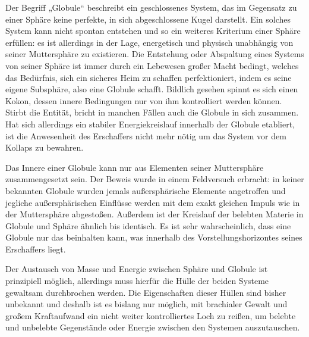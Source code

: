 \documentclass[a5paper,8pt]{book}
\begin{document}
Der Begriff „Globule“ beschreibt ein geschlossenes System, das im Gegensatz zu einer Sphäre keine perfekte, in sich 
abgeschlossene Kugel darstellt. Ein solches System kann nicht spontan entstehen und so ein weiteres Kriterium einer 
Sphäre erfüllen: es ist allerdings in der Lage, energetisch und physisch unabhängig von seiner Muttersphäre zu existieren. 
Die Entstehung oder Abspaltung eines Systems von seiner Sphäre ist immer durch ein Lebewesen großer Macht bedingt, welches 
das Bedürfnis, sich ein sicheres Heim zu schaffen perfektioniert, indem es seine eigene Subsphäre, also eine Globule 
schafft. Bildlich gesehen spinnt es sich einen Kokon, dessen innere Bedingungen nur von ihm kontrolliert werden können. 
Stirbt die Entität, bricht in manchen Fällen auch die Globule in sich zusammen. Hat sich allerdings ein stabiler 
Energiekreislauf innerhalb der Globule etabliert, ist die Anwesenheit des Erschaffers nicht mehr nötig um das System vor 
dem Kollaps zu bewahren. 

Das Innere einer Globule kann nur aus Elementen seiner Muttersphäre zusammengesetzt sein. Der Beweis wurde in einem 
Feldversuch erbracht: in keiner bekannten Globule wurden jemals außersphärische Elemente angetroffen und jegliche 
außersphärischen Einflüsse werden mit dem exakt gleichen Impuls wie in der Muttersphäre abgestoßen. Außerdem ist der 
Kreislauf der belebten Materie in Globule und Sphäre ähnlich bis identisch. Es ist sehr wahrscheinlich, dass eine Globule 
nur das beinhalten kann, was innerhalb des Vorstellungshorizontes seines Erschaffers liegt.

Der Austausch von Masse und Energie zwischen Sphäre und Globule ist prinzipiell möglich, allerdings muss hierfür die Hülle 
der beiden Systeme gewaltsam durchbrochen werden. Die Eigenschaften dieser Hüllen sind bisher unbekannt und deshalb ist es 
bislang nur möglich, mit brachialer Gewalt und großem Kraftaufwand ein nicht weiter kontrolliertes Loch zu reißen, um 
belebte und unbelebte Gegenstände oder Energie zwischen den Systemen auszutauschen.
\end{document}
